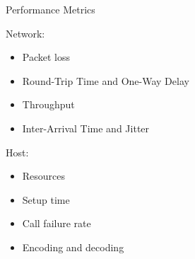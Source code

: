 \documentclass[first=red,second=purple,logo=yellowexc]{aaltoslides}
\begin{document}
%


\begin{frame}{Performance Metrics}

Network:
\begin{itemize}
\item Packet loss
\item Round-Trip Time and One-Way Delay
\item Throughput
\item Inter-Arrival Time and Jitter
\end{itemize}

Host:
\begin{itemize}
\item Resources
\item Setup time
\item Call failure rate
\item Encoding and decoding
\end{itemize}


\end{frame}
%
%
\end{document}
